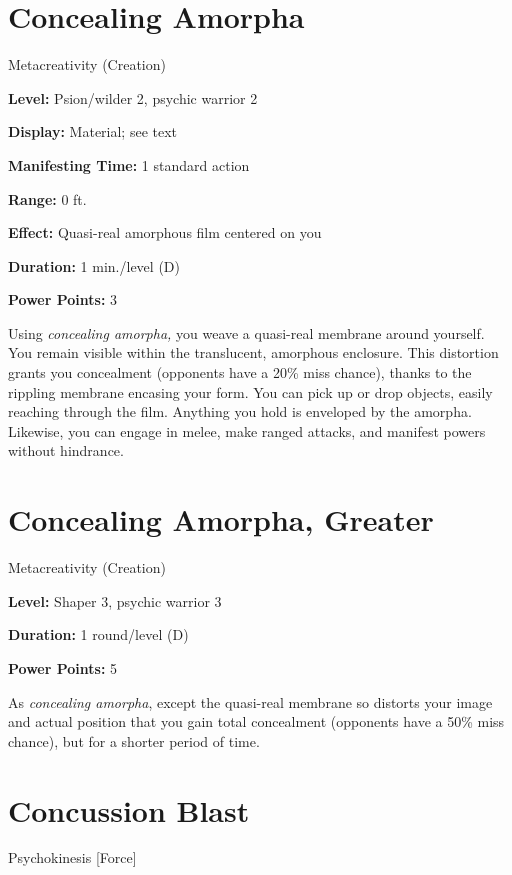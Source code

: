 \documentclass{article}
\begin{document}
\vspace{12pt}
\section*{Concealing Amorpha}

Metacreativity (Creation)

\textbf{Level:} Psion/wilder 2, psychic warrior 2

\textbf{Display:} Material; see text

\textbf{Manifesting Time:} 1 standard action

\textbf{Range:} 0 ft.

\textbf{Effect:} Quasi-real amorphous film centered on you

\textbf{Duration:} 1 min./level (D)

\textbf{Power Points:} 3

Using \textit{concealing amorpha, }you weave a quasi-real membrane around yourself. 
You remain visible within the translucent, amorphous enclosure. This distortion 
grants you concealment (opponents have a 20\% miss chance), thanks to the rippling 
membrane encasing your form. You can pick up or drop objects, easily reaching through 
the film. Anything you hold is enveloped by the amorpha. Likewise, you can engage 
in melee, make ranged attacks, and manifest powers without hindrance.

\vspace{12pt}
\section*{Concealing Amorpha, Greater}

Metacreativity (Creation)

\textbf{Level:} Shaper 3, psychic warrior 3

\textbf{Duration:} 1 round/level (D)

\textbf{Power Points:} 5

As \textit{concealing amorpha}, except the quasi-real membrane so distorts your 
image and actual position that you gain total concealment (opponents have a 50\% 
miss chance), but for a shorter period of time.

\vspace{12pt}
\section*{Concussion Blast}

Psychokinesis [Force]
\end{document}

